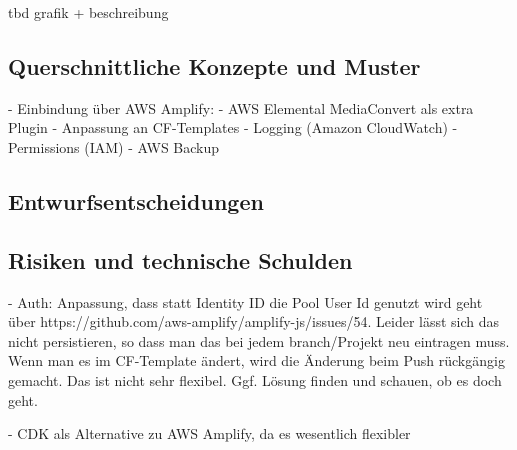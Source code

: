 tbd grafik + beschreibung

\subsection{Querschnittliche Konzepte und Muster}

- Einbindung über \ac{AWS} Amplify:
  - AWS Elemental MediaConvert als extra Plugin
  - Anpassung an CF-Templates
- Logging (Amazon CloudWatch)
- Permissions (IAM)
- AWS Backup

\subsection{Entwurfsentscheidungen}

\subsection{Risiken und technische Schulden}

- Auth: Anpassung, dass statt Identity ID die Pool User Id genutzt wird geht über https://github.com/aws-amplify/amplify-js/issues/54. Leider lässt sich das nicht persistieren, so dass man das bei jedem branch/Projekt neu eintragen muss. Wenn man es im CF-Template ändert, wird die Änderung beim Push rückgängig gemacht. Das ist nicht sehr flexibel. Ggf. Lösung finden und schauen, ob es doch geht.

- CDK als Alternative zu AWS Amplify, da es wesentlich flexibler